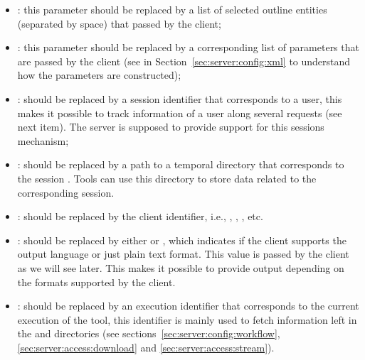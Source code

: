 \begin{itemize}
\item {}: this parameter should be
  replaced by a list of selected outline entities (separated by space)
  that passed by the client;
\item {}: this parameter should be
  replaced by a corresponding list of parameters that are passed by
  the client (see  in
  Section~\ref{sec:server:config:xml} to understand how the parameters
  are constructed);
\item {}: should be replaced by a
  session identifier that corresponds to a user, this makes it
  possible to track information of a user along several requests (see
  next item). The server is supposed to provide support for this
  sessions mechanism; 
\item {}: should be replaced by a path
  to a temporal directory that corresponds to the session
  . Tools can use this directory to
  store data related to the corresponding session.
\item {}: should be replaced by the
  client identifier, i.e., , ,
  , etc.
%
\item {}: should be replaced by either
   or , which indicates if the client supports the
  \ei output language or just plain text format. This value is passed
  by the client as we will see later. This makes it possible to
  provide output depending on the formats supported by the client.%
%
\item {}: should be replaced by an
  execution identifier that corresponds to the current execution of
  the tool, this identifier is mainly used to fetch information left
  in the  and 
  directories (see sections~\ref{sec:server:config:workflow},
  \ref{sec:server:access:download} and
  \ref{sec:server:access:stream}).
\end{itemize}

